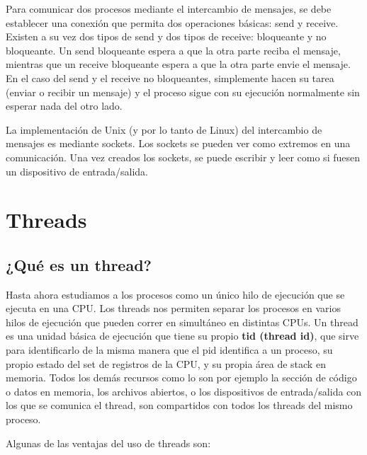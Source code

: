 \documentclass{article}
\begin{document}
Para comunicar dos procesos mediante el intercambio de mensajes, se debe establecer una conexi\'on que permita dos operaciones b\'asicas: send y receive. Existen a su vez dos tipos de send y dos tipos de receive: bloqueante y no bloqueante. Un send bloqueante espera a que la otra parte reciba el mensaje, mientras que un receive bloqueante espera a que la otra parte envie el mensaje. En el caso del send y el receive no bloqueantes, simplemente hacen su tarea (enviar o recibir un mensaje) y el proceso sigue con su ejecuci\'on normalmente sin esperar nada del otro lado.

La implementaci\'on de Unix (y por lo tanto de Linux) del intercambio de mensajes es mediante sockets. Los sockets se pueden ver como extremos en una comunicaci\'on. Una vez creados los sockets, se puede escribir y leer como si fuesen un dispositivo de entrada/salida.

\section{Threads}

\subsection{¿Qu\'e es un thread?}

Hasta ahora estudiamos a los procesos como un \'unico hilo de ejecuci\'on que se ejecuta en una CPU. Los threads nos permiten separar los procesos en varios hilos de ejecuci\'on que pueden correr en simult\'aneo en distintas CPUs. Un thread es una unidad b\'asica de ejecuci\'on que tiene su propio \textbf{tid (thread id)}, que sirve para identificarlo de la misma manera que el pid identifica a un proceso, su propio estado del set de registros de la CPU, y su propia \'area de stack en memoria. Todos los dem\'as recursos como lo son por ejemplo la secci\'on de c\'odigo o datos en memoria, los archivos abiertos, o los dispositivos de entrada/salida con los que se comunica el thread, son compartidos con todos los threads del mismo proceso.

Algunas de las ventajas del uso de threads son:
\end{document}
